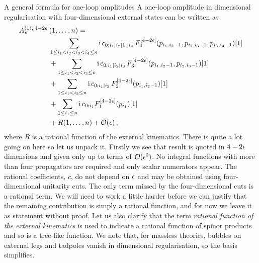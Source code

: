 \begin{important}{A general formula for one-loop amplitudes}
A one-loop amplitude in dimensional regularisation with four-dimensional external states can be written as
\begin{align}
  A^{(1),[4-2\epsilon]}_n&(1,\ldots,n) = \nonumber\\&
    \sum_{1\leq i_1<i_2<i_3<i_4\leq n} \mathrm{i} \, c_{0;i_1|i_2|i_3|i_4} \, F^{[4-2\epsilon]}_4(p_{i_1,i_2-1},p_{i_2,i_3-1},p_{i_3,i_4-1})[1]\nonumber\\&
  + \sum_{1\leq i_1<i_2<i_3\leq n} \mathrm{i} \, c_{0;i_1|i_2|i_3} \, F^{[4-2\epsilon]}_3(p_{i_1,i_2-1},p_{i_2,i_3-1})[1]\nonumber\\&
  + \sum_{1\leq i_1<i_2\leq n} \mathrm{i} \, c_{0;i_1|i_2} \, F^{[4-2\epsilon]}_2(p_{i_1,i_2-1})[1]\nonumber\\&
  + \sum_{1\leq i_1\leq n} \mathrm{i} \, c_{0;i_1} F^{[4-2\epsilon]}_1(p_{i_1})[1]\nonumber\\&
  + R(1,\ldots,n) + \mathcal{O}(\epsilon) \,,
  \label{eq:oneloop4dbasis}  
\end{align}
where $R$ is a rational function of the external kinematics. There is quite a
lot going on here so let us unpack it. Firstly we see that result is quoted
in $4-2\epsilon$ dimensions and given only up to terms of $\mathcal{O}(\epsilon^0)$. No
integral functions with more than four propagators are required and only scalar
numerators appear. The rational coefficients, $c$, do not depend on $\epsilon$ and
may be obtained using four-dimensional unitarity cuts. The only term missed by
the four-dimensional cuts is a rational term. We will need to work a little
harder before we can justify that the remaining contribution is simply a
rational function, and for now we leave it as statement without proof. Let us also
clarify that the term \textit{rational function of the external kinematics} is
used to indicate a rational function of spinor products and so is a tree-like
function. We note that, for massless theories, bubbles on external legs and tadpoles
vanish in dimensional regularisation, so the basis simplifies.
\end{important}

